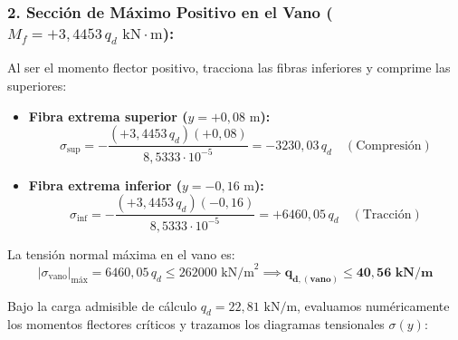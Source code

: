 \subsubsection*{2. Sección de Máximo Positivo en el Vano ($M_f = +3{,}4453\,q_d\text{ kN}\cdot\text{m}$):}
Al ser el momento flector positivo, tracciona las fibras inferiores y comprime las superiores:
\begin{itemize}
    \item \textbf{Fibra extrema superior ($y = +0{,}08\text{ m}$):}
          \begin{equation}
              \sigma_{\text{sup}} = -\frac{(+3{,}4453\,q_d)(+0{,}08)}{8{,}5333 \cdot 10^{-5}} = -3230{,}03\,q_d \quad (\text{Compresión})
          \end{equation}
    \item \textbf{Fibra extrema inferior ($y = -0{,}16\text{ m}$):}
          \begin{equation}
              \sigma_{\text{inf}} = -\frac{(+3{,}4453\,q_d)(-0{,}16)}{8{,}5333 \cdot 10^{-5}} = +6460{,}05\,q_d \quad (\text{Tracción})
          \end{equation}
\end{itemize}
La tensión normal máxima en el vano es:
\begin{equation}
    |\sigma_{\text{vano}}|_{\text{máx}} = 6460{,}05\,q_d \leq 262000\text{ kN/m}^2 \implies \mathbf{q_{d,(\text{vano})} \leq 40{,}56\text{ kN/m}}
\end{equation}



Bajo la carga admisible de cálculo $q_d = 22{,}81\text{ kN/m}$, evaluamos numéricamente los momentos flectores críticos y trazamos los diagramas tensionales $\sigma(y)$:

